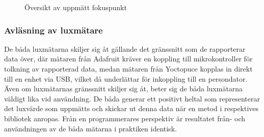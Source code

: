             \begin{figure}
            \centering
                \setlength{\fboxsep}{0pt}
                \caption{\label{fig:array1}Översikt av uppmätt fokuspunkt}
            \end{figure}


        \subsubsection{Avläsning av luxmätare} %
        \label{ssub:avlasning_av_luxmatare}
            De båda luxmätarna skiljer sig åt gällande det gränssnitt som de rapporterar data över, där mätaren från Adafruit kräver en koppling till mikrokontroller för tolkning av rapporterad data, medan mätaren från Yoctopuce kopplas in direkt till en enhet via USB, vilket då underlättar för inkoppling till en persondator. Även om luxmätarnas gränssnitt skiljer sig åt, beter sig de båda luxmätarna väldigt lika vid användning. De båda generar ett positivt heltal som representerar det luxvärde som uppmätts och skickar ut denna data när en metod i respektives bibliotek anropas. Från en programmerares perspektiv är resultatet från- och användningen av de båda mätarna i praktiken identisk.\bigskip

